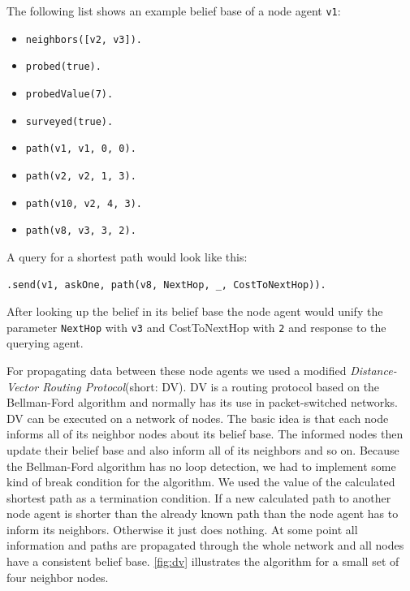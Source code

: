 \begin{samepage}
The following list shows an example belief base of a node agent \texttt{v1}:
\begin{itemize}
  \item \texttt{neighbors([v2, v3]).}
  \item \texttt{probed(true).}
  \item \texttt{probedValue(7).}
  \item \texttt{surveyed(true).}
  \item \texttt{path(v1, v1, 0, 0).}
  \item \texttt{path(v2, v2, 1, 3).}
  \item \texttt{path(v10, v2, 4, 3).}
  \item \texttt{path(v8, v3, 3, 2).}
\end{itemize}
\end{samepage}

A query for a shortest path would look like this:
\begin{lstlisting}[caption={Query for shortest path from \texttt{v1} to \texttt{v8}}, label={lst:dv_shortestPath_query}]
  .send(v1, askOne, path(v8, NextHop, _, CostToNextHop)).
\end{lstlisting}
After looking up the belief in its belief base the node agent would unify the parameter \texttt{NextHop} with \texttt{v3} and CostToNextHop with \texttt{2} and response to the querying agent.

For propagating data between these node agents we used a modified \emph{Distance-Vector Routing Protocol}(short: DV). DV is a routing protocol based on the Bellman-Ford algorithm and normally has its use in packet-switched networks. DV can be executed on a network of nodes. The basic idea is that each node informs all of its neighbor nodes about its belief base. The informed nodes then update their belief base and also inform all of its neighbors and so on. Because the Bellman-Ford algorithm has no loop detection, we had to implement some kind of break condition for the algorithm. We used the value of the calculated shortest path as a termination condition. If a new calculated path to another node agent is shorter than the already known path than the node agent has to inform its neighbors. Otherwise it just does nothing. At some point all information and paths are propagated through the whole network and all nodes have a consistent belief base. \autoref{fig:dv} illustrates the algorithm for a small set of four neighbor nodes.


